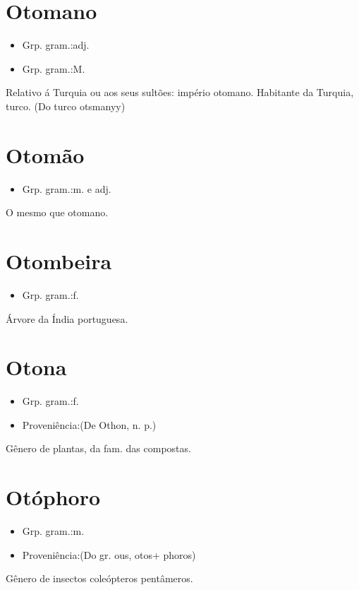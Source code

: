 \section{Otomano}
\begin{itemize}
\item {Grp. gram.:adj.}
\end{itemize}
\begin{itemize}
\item {Grp. gram.:M.}
\end{itemize}
Relativo á Turquia ou aos seus sultões: \textunderscore império otomano\textunderscore .
Habitante da Turquia, turco.
(Do turco \textunderscore otsmanyy\textunderscore )
\section{Otomão}
\begin{itemize}
\item {Grp. gram.:m.  e  adj.}
\end{itemize}
O mesmo que \textunderscore otomano\textunderscore .
\section{Otombeira}
\begin{itemize}
\item {Grp. gram.:f.}
\end{itemize}
Árvore da Índia portuguesa.
\section{Otona}
\begin{itemize}
\item {Grp. gram.:f.}
\end{itemize}
\begin{itemize}
\item {Proveniência:(De \textunderscore Othon\textunderscore , n. p.)}
\end{itemize}
Gênero de plantas, da fam. das compostas.
\section{Otóphoro}
\begin{itemize}
\item {Grp. gram.:m.}
\end{itemize}
\begin{itemize}
\item {Proveniência:(Do gr. \textunderscore ous\textunderscore , \textunderscore otos\textunderscore  + \textunderscore phoros\textunderscore )}
\end{itemize}
Gênero de insectos coleópteros pentâmeros.

